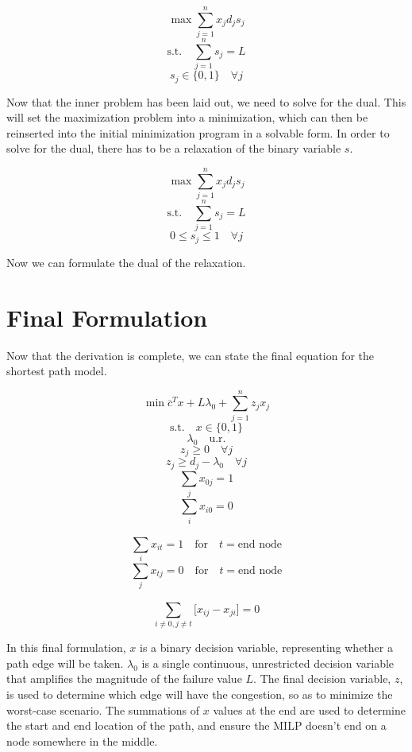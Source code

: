 \documentclass{article}
\begin{document}
$$
\max \sum_{j = 1}^{n} x_{j}d_{j}s_{j}
$$
$$
\textrm{s.t.} \quad \sum_{j =1}^{n} s_{j} = L
$$
$$
s_{j} \in \{0,1\} \quad \forall j
$$

Now that the inner problem has been laid out, we need to solve for the dual. This will set the maximization problem into a minimization, which can then be reinserted into the initial minimization program in a solvable form. In order to solve for the dual, there has to be a relaxation of the binary variable $s$.

$$
\max \sum_{j = 1}^{n} x_{j}d_{j}s_{j}
$$
$$
\textrm{s.t.} \quad \sum_{j =1}^{n} s_{j} = L
$$
$$
0 \leq s_{j} \leq 1 \quad \forall j
$$

Now we can formulate the dual of the relaxation.

\section{Final Formulation}
Now that the derivation is complete, we can state the final equation for the shortest path model.

$$
\min \overline{c}^T x + L \lambda_0 + \sum_{j = 1}^{n} z_{j} x_{j}
$$
$$
\textrm{s.t.} \quad x \in \{0,1\}
$$
$$
\lambda_0 \quad \textrm{u.r.}
$$
$$
z_{j} \geq 0 \quad \forall j
$$
$$
z_{j} \geq d_{j} - \lambda_0 \quad \forall j
$$
$$
\sum_{j}^{} x_{0j} = 1
$$
$$
\sum_{i}^{} x_{i0} = 0
$$

$$
\sum_{i}^{} x_{it} = 1 \quad \textrm{for} \quad t = \textrm{end node}
$$
$$
\sum_{j}^{} x_{tj} = 0 \quad \textrm{for} \quad t = \textrm{end node}
$$

$$
\sum_{i \neq 0, j \neq t}^{} \lbrack x_{ij} - x_{ji} \rbrack = 0
$$

In this final formulation, $x$ is a binary decision variable, representing whether a path edge will be taken. $\lambda_0$ is a single continuous, unrestricted decision variable that amplifies the magnitude of the failure value $L$. The final decision variable, $z$, is used to determine which edge will have the congestion, so as to minimize the worst-case scenario. The summations of $x$ values at the end are used to determine the start and end location of the path, and ensure the MILP doesn't end on a node somewhere in the middle.
\end{document}
